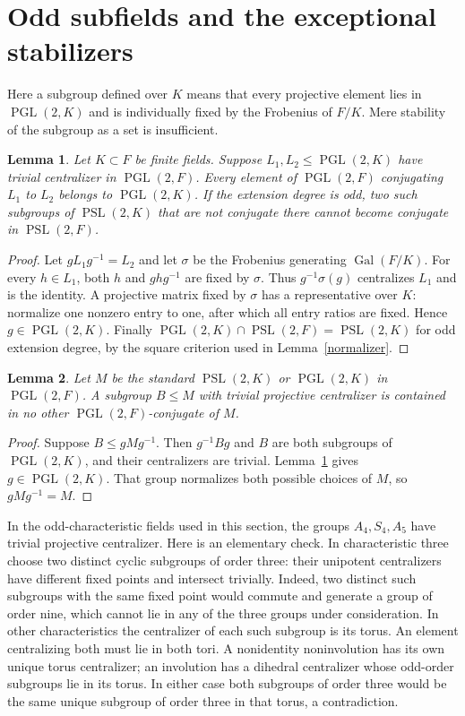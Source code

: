 \documentclass[11pt]{article}
\newtheorem{lemma}{Lemma}\newtheorem{theorem}[lemma]{Theorem}
\newcommand{\PSL}{\operatorname{PSL}}\newcommand{\PGL}{\operatorname{PGL}}
\begin{document}
\section{Odd subfields and the exceptional stabilizers}
Here a subgroup defined over $K$ means that every projective element
lies in $\PGL(2,K)$ and is individually fixed by the Frobenius
of $F/K$. Mere stability of the subgroup as a set is insufficient.

\begin{lemma}\label{descent}
Let $K\subset F$ be finite fields.
Suppose $L_1,L_2\le\PGL(2,K)$ have trivial centralizer in
$\PGL(2,F)$. Every element of $\PGL(2,F)$ conjugating $L_1$
to $L_2$ belongs to $\PGL(2,K)$. If the extension degree is odd, two such subgroups
of $\PSL(2,K)$ that are not conjugate there cannot become conjugate
in $\PSL(2,F)$.
\end{lemma}
\begin{proof}
Let $gL_1g^{-1}=L_2$ and let $\sigma$ be the Frobenius generating
$\operatorname{Gal}(F/K)$. For every $h\in L_1$, both $h$ and
$ghg^{-1}$ are fixed by $\sigma$. Thus $g^{-1}\sigma(g)$
centralizes $L_1$ and is the identity. A projective matrix fixed by
$\sigma$ has a representative over $K$: normalize one nonzero
entry to one, after which all entry ratios are fixed. Hence
$g\in\PGL(2,K)$. Finally
$\PGL(2,K)\cap\PSL(2,F)=\PSL(2,K)$ for odd extension degree,
by the square criterion used in Lemma~\ref{normalizer}.
\end{proof}

\begin{lemma}\label{unique-descent}
Let $M$ be the standard $\PSL(2,K)$ or $\PGL(2,K)$ in
$\PGL(2,F)$. A subgroup $B\le M$ with trivial projective
centralizer is contained in no other $\PGL(2,F)$-conjugate of $M$.
\end{lemma}
\begin{proof}
Suppose $B\le gMg^{-1}$. Then $g^{-1}Bg$ and $B$ are both
subgroups of $\PGL(2,K)$, and their centralizers are trivial.
Lemma~\ref{descent} gives $g\in\PGL(2,K)$. That group normalizes
both possible choices of $M$, so $gMg^{-1}=M$.
\end{proof}

In the odd-characteristic fields used in this section, the groups
$A_4,S_4,A_5$ have trivial projective centralizer.
Here is an elementary check. In
characteristic three choose two distinct cyclic subgroups of order
three: their unipotent centralizers have different fixed points and
intersect trivially. Indeed, two distinct such subgroups with the
same fixed point would commute and generate a group of order nine,
which cannot lie in any of the three groups under consideration. In other characteristics the centralizer of each
such subgroup is its torus. An element centralizing both must lie
in both tori. A nonidentity noninvolution has its own unique torus
centralizer; an involution has a dihedral centralizer whose odd-order
subgroups lie in its torus. In either case both subgroups of order
three would be the same unique subgroup of order three in that
torus, a contradiction.
\end{document}
